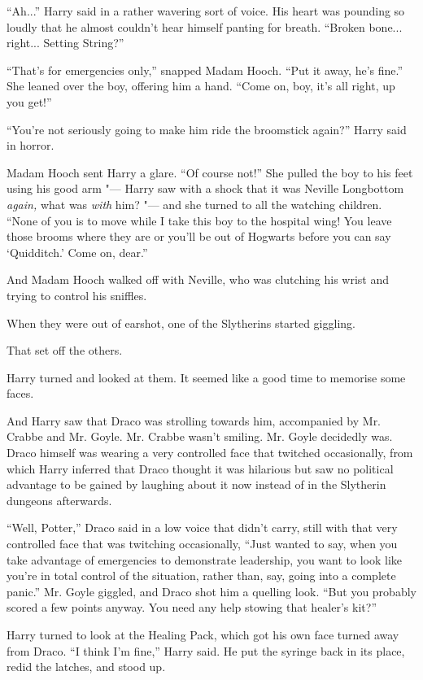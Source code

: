 ``Ah...'' Harry said in a rather wavering sort of voice. His heart
was pounding so loudly that he almost couldn't hear himself panting for
breath. ``Broken bone... right... Setting String?''

``That's for emergencies only,'' snapped Madam Hooch. ``Put it away,
he's fine.'' She leaned over the boy, offering him a hand. ``Come on,
boy, it's all right, up you get!''

``You're not seriously going to make him ride the broomstick again?''
Harry said in horror.

Madam Hooch sent Harry a glare. ``Of course not!'' She pulled the boy to
his feet using his good arm "--- Harry saw with a shock that it was Neville
Longbottom \emph{again,} what was \emph{with} him? "--- and she turned to
all the watching children. ``None of you is to move while I take this
boy to the hospital wing! You leave those brooms where they are or
you'll be out of Hogwarts before you can say `Quidditch.' Come on,
dear.''

And Madam Hooch walked off with Neville, who was clutching his wrist and
trying to control his sniffles.

When they were out of earshot, one of the Slytherins started giggling.

That set off the others.

Harry turned and looked at them. It seemed like a good time to memorise
some faces.

And Harry saw that Draco was strolling towards him, accompanied by Mr.
Crabbe and Mr. Goyle. Mr. Crabbe wasn't smiling. Mr. Goyle decidedly
was. Draco himself was wearing a very controlled face that twitched
occasionally, from which Harry inferred that Draco thought it was
hilarious but saw no political advantage to be gained by laughing about
it now instead of in the Slytherin dungeons afterwards.

``Well, Potter,'' Draco said in a low voice that didn't carry, still
with that very controlled face that was twitching occasionally, ``Just
wanted to say, when you take advantage of emergencies to demonstrate
leadership, you want to look like you're in total control of the
situation, rather than, say, going into a complete panic.'' Mr. Goyle
giggled, and Draco shot him a quelling look. ``But you probably scored a
few points anyway. You need any help stowing that healer's kit?''

Harry turned to look at the Healing Pack, which got his own face turned
away from Draco. ``I think I'm fine,'' Harry said. He put the syringe
back in its place, redid the latches, and stood up.

